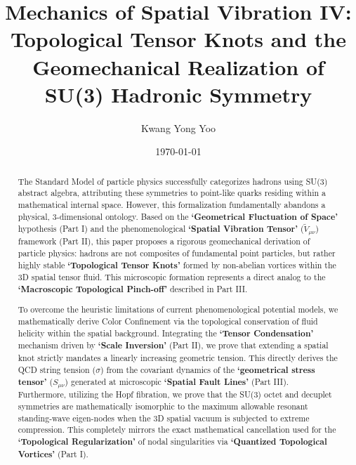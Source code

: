 \documentclass[reprint,amsmath,amssymb,aps,prd]{revtex4-2}
\begin{document}

\title{Mechanics of Spatial Vibration IV: Topological Tensor Knots and the Geomechanical Realization of SU(3) Hadronic Symmetry}

\author{Kwang Yong Yoo}

\date{\today}

\begin{abstract}
The Standard Model of particle physics successfully categorizes hadrons using SU(3) abstract algebra, attributing these symmetries to point-like quarks residing within a mathematical internal space. However, this formalization fundamentally abandons a physical, 3-dimensional ontology. Based on the \textbf{`Geometrical Fluctuation of Space'} hypothesis (Part I) and the phenomenological \textbf{`Spatial Vibration Tensor'} ($\tilde{V}_{\mu\nu}$) framework (Part II), this paper proposes a rigorous geomechanical derivation of particle physics: hadrons are not composites of fundamental point particles, but rather highly stable \textbf{`Topological Tensor Knots'} formed by non-abelian vortices within the 3D spatial tensor fluid. This microscopic formation represents a direct analog to the \textbf{`Macroscopic Topological Pinch-off'} described in Part III.

To overcome the heuristic limitations of current phenomenological potential models, we mathematically derive Color Confinement via the topological conservation of fluid helicity within the spatial background. Integrating the \textbf{`Tensor Condensation'} mechanism driven by \textbf{`Scale Inversion'} (Part II), we prove that extending a spatial knot strictly mandates a linearly increasing geometric tension. This directly derives the QCD string tension ($\sigma$) from the covariant dynamics of the \textbf{`geometrical stress tensor'} ($S_{\mu\nu}$) generated at microscopic \textbf{`Spatial Fault Lines'} (Part III). Furthermore, utilizing the Hopf fibration, we prove that the SU(3) octet and decuplet symmetries are mathematically isomorphic to the maximum allowable resonant standing-wave eigen-nodes when the 3D spatial vacuum is subjected to extreme compression. This completely mirrors the exact mathematical cancellation used for the \textbf{`Topological Regularization'} of nodal singularities via \textbf{`Quantized Topological Vortices'} (Part I).


\end{abstract}
\end{document}
